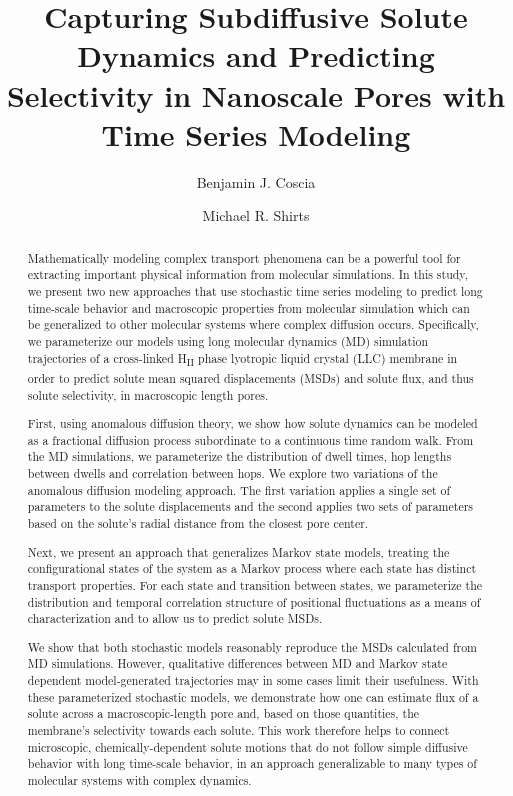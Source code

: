 \documentclass[journal=jctcce,manuscript=article]{achemso}
\title{Capturing Subdiffusive Solute Dynamics and Predicting Selectivity in Nanoscale Pores with Time Series Modeling}
\author{Benjamin J. Coscia}
\affiliation{Department of Chemical and Biological Engineering, University of Colorado Boulder, Boulder, CO 80309, USA}
\author{Michael R. Shirts}
\affiliation{Department of Chemical and Biological Engineering, University of Colorado Boulder, Boulder, CO 80309, USA}
\begin{document}
  
  \begin{abstract}
  
  Mathematically modeling complex transport phenomena can be a
  powerful tool for extracting important physical information from 
  molecular simulations. In this study, we present two new approaches 
  that use stochastic time series modeling to predict long time-scale 
  behavior and macroscopic properties from molecular simulation which
  can be generalized to other molecular systems where complex diffusion
  occurs.
  Specifically, we parameterize our models using long molecular dynamics (MD) simulation
  trajectories of a cross-linked H\textsubscript{II} phase lyotropic liquid
  crystal (LLC) membrane in order to predict solute mean squared displacements (MSDs)
  and solute flux, and thus solute selectivity, in macroscopic length pores.

  First, using anomalous diffusion theory, we show how solute dynamics can be
  modeled as a fractional diffusion process subordinate to a continuous time 
  random walk. From the MD simulations, we parameterize the distribution of 
  dwell times, hop lengths between dwells and correlation between hops. We 
  explore two variations of the anomalous diffusion modeling approach. The first variation
  applies a single set of parameters to the solute displacements and the second
  applies two sets of parameters based on the solute's radial distance from the
  closest pore center. 

  Next, we present an approach that generalizes Markov state models,
  treating the configurational states of the system as a Markov
  process where each state has distinct transport properties. For each
  state and transition between states, we parameterize the
  distribution and temporal correlation structure of positional
  fluctuations as a means of characterization and to allow us to
  predict solute MSDs. 
 
  We show that both stochastic models reasonably reproduce the MSDs
  calculated from MD simulations. However, qualitative differences
  between MD and Markov state dependent model-generated trajectories
  may in some cases limit their usefulness. With these parameterized
  stochastic models, we demonstrate how one can estimate flux of a
  solute across a macroscopic-length pore and, based on those
  quantities, the membrane's selectivity towards each solute. This
  work therefore helps to connect microscopic, chemically-dependent
  solute motions that do not follow simple diffusive behavior with
  long time-scale behavior, in an approach generalizable to many types
  of molecular systems with complex dynamics.

  \end{abstract}
\end{document}
